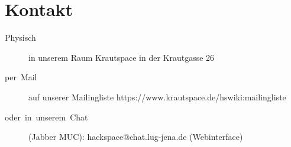 \documentclass[ngerman]{paper}
\begin{document}
\section*{Kontakt}
\begin{description}
\item [{Physisch}] in unserem Raum \textquotedbl{}Krautspace\textquotedbl{}
in der Krautgasse 26
\item [{per~Mail}] auf unserer Mailingliste https://www.krautspace.de/hswiki:mailingliste
\item [{oder~in~unserem~Chat}] (Jabber MUC): hackspace@chat.lug-jena.de
(Webinterface)\end{description}
\vfill
{}
\end{document}
